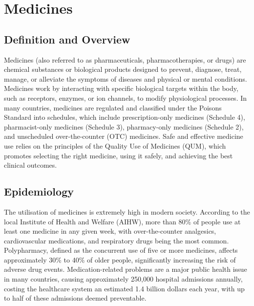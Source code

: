 \chapter{Medicines}

\section*{Definition and Overview}
Medicines (also referred to as pharmaceuticals, pharmacotherapies, or drugs) are chemical substances or biological products designed to prevent, diagnose, treat, manage, or alleviate the symptoms of diseases and physical or mental conditions. Medicines work by interacting with specific biological targets within the body, such as receptors, enzymes, or ion channels, to modify physiological processes. In many countries, medicines are regulated and classified under the Poisons Standard into schedules, which include prescription-only medicines (Schedule 4), pharmacist-only medicines (Schedule 3), pharmacy-only medicines (Schedule 2), and unscheduled over-the-counter (OTC) medicines. Safe and effective medicine use relies on the principles of the Quality Use of Medicines (QUM), which promotes selecting the right medicine, using it safely, and achieving the best clinical outcomes.

\section*{Epidemiology}
The utilisation of medicines is extremely high in modern society. According to the local Institute of Health and Welfare (AIHW), more than 80\% of people use at least one medicine in any given week, with over-the-counter analgesics, cardiovascular medications, and respiratory drugs being the most common. Polypharmacy, defined as the concurrent use of five or more medicines, affects approximately 30\% to 40\% of older people, significantly increasing the risk of adverse drug events. Medication-related problems are a major public health issue in many countries, causing approximately 250,000 hospital admissions annually, costing the healthcare system an estimated 1.4 billion dollars each year, with up to half of these admissions deemed preventable.

